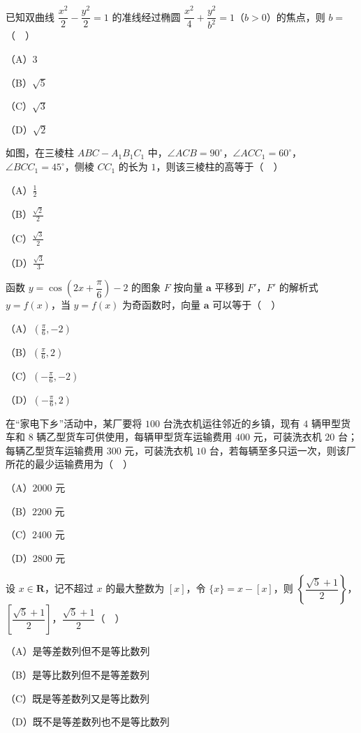 \begin{question}
已知双曲线 $\dfrac{x^2}{2}-\dfrac{y^2}{2}=1$ 的准线经过椭圆 $\dfrac{x^2}{4}+\dfrac{y^2}{b^2}=1$（$b>0$）的焦点，则 $b=$（　）

（A）$3$

（B）$\sqrt5$

（C）$\sqrt3$

（D）$\sqrt2$

\Needspace{0.4\textheight}
\end{question}
\begingroup
\renewenvironment{question}{\Needspace{0.5\textheight}}{}
\begin{question}
如图，在三棱柱 $ABC-A_1B_1C_1$ 中，$\angle ACB=90^\circ$，$\angle ACC_1=60^\circ$，$\angle BCC_1=45^\circ$，侧棱 $CC_1$ 的长为 $1$，则该三棱柱的高等于（　）

（A）$\frac12$

（B）$\frac{\sqrt2}{2}$

（C）$\frac{\sqrt3}{2}$

（D）$\frac{\sqrt3}{3}$
\nopagebreak[4]
\begin{center}\end{center}
\nopagebreak[4]
\end{question}
\endgroup
\begin{question}
函数 $y=\cos\left(2x+\dfrac\pi6\right)-2$ 的图象 $F$ 按向量 $\boldsymbol a$ 平移到 $F'$，$F'$ 的解析式 $y=f(x)$，当 $y=f(x)$ 为奇函数时，向量 $\boldsymbol a$ 可以等于（　）

（A）$\left(\frac\pi6,-2\right)$

（B）$\left(\frac\pi6,2\right)$

（C）$\left(-\frac\pi6,-2\right)$

（D）$\left(-\frac\pi6,2\right)$

\end{question}
\begin{question}
在“家电下乡”活动中，某厂要将 $100$ 台洗衣机运往邻近的乡镇，现有 $4$ 辆甲型货车和 $8$ 辆乙型货车可供使用，每辆甲型货车运输费用 $400$ 元，可装洗衣机 $20$ 台；每辆乙型货车运输费用 $300$ 元，可装洗衣机 $10$ 台，若每辆至多只运一次，则该厂所花的最少运输费用为（　）

（A）$2000$ 元

（B）$2200$ 元

（C）$2400$ 元

（D）$2800$ 元

\end{question}
\begin{question}
设 $x\in\mathbf R$，记不超过 $x$ 的最大整数为 $[x]$，令 $\{x\}=x-[x]$，则 $\left\{\dfrac{\sqrt5+1}{2}\right\}$，$\left[\dfrac{\sqrt5+1}{2}\right]$，$\dfrac{\sqrt5+1}{2}$（　）

（A）是等差数列但不是等比数列

（B）是等比数列但不是等差数列

（C）既是等差数列又是等比数列

（D）既不是等差数列也不是等比数列

\Needspace{0.4\textheight}
\end{question}
